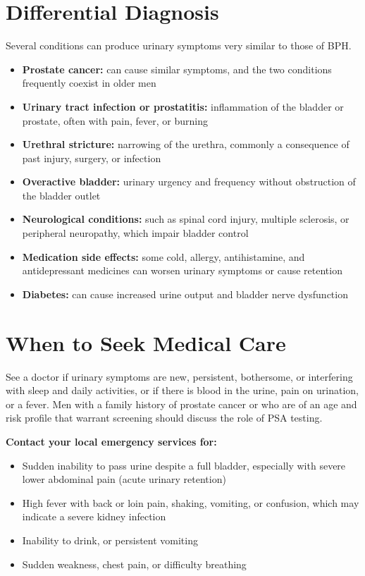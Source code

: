 \section*{Differential Diagnosis}
Several conditions can produce urinary symptoms very similar to those of BPH.

\begin{itemize}
    \item \textbf{Prostate cancer:} can cause similar symptoms, and the two conditions frequently coexist in older men
    \item \textbf{Urinary tract infection or prostatitis:} inflammation of the bladder or prostate, often with pain, fever, or burning
    \item \textbf{Urethral stricture:} narrowing of the urethra, commonly a consequence of past injury, surgery, or infection
    \item \textbf{Overactive bladder:} urinary urgency and frequency without obstruction of the bladder outlet
    \item \textbf{Neurological conditions:} such as spinal cord injury, multiple sclerosis, or peripheral neuropathy, which impair bladder control
    \item \textbf{Medication side effects:} some cold, allergy, antihistamine, and antidepressant medicines can worsen urinary symptoms or cause retention
    \item \textbf{Diabetes:} can cause increased urine output and bladder nerve dysfunction
\end{itemize}

\section*{When to Seek Medical Care}
See a doctor if urinary symptoms are new, persistent, bothersome, or interfering with sleep and daily activities, or if there is blood in the urine, pain on urination, or a fever. Men with a family history of prostate cancer or who are of an age and risk profile that warrant screening should discuss the role of PSA testing.

\textbf{Contact your local emergency services for:}
\begin{itemize}
    \item Sudden inability to pass urine despite a full bladder, especially with severe lower abdominal pain (acute urinary retention)
    \item High fever with back or loin pain, shaking, vomiting, or confusion, which may indicate a severe kidney infection
    \item Inability to drink, or persistent vomiting
    \item Sudden weakness, chest pain, or difficulty breathing
\end{itemize}

